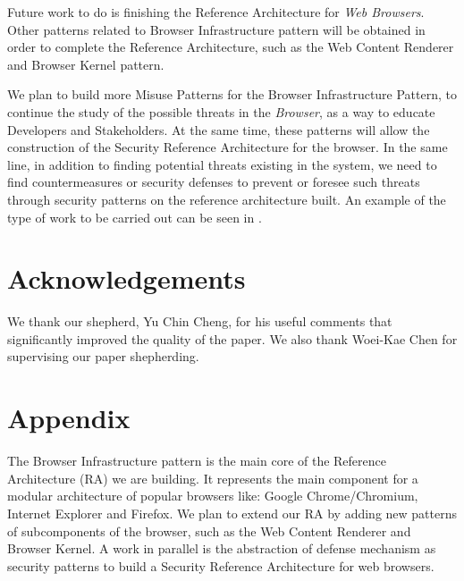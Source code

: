 \documentclass{sig-alternate-05-2015}
\begin{document}
Future work to do is finishing the Reference Architecture for \textit{Web Browsers}. Other patterns related to Browser Infrastructure pattern will be obtained in order to complete the Reference Architecture, such as the Web Content Renderer and Browser Kernel pattern. 

We plan to build more Misuse Patterns for the Browser Infrastructure Pattern, to continue the study of the possible threats in the \textit{Browser}, as a way to educate Developers and Stakeholders. At the same time, these patterns will allow the construction of the Security Reference Architecture for the browser. In the same line, in addition to finding potential threats existing in the system, we need to find countermeasures or security defenses to prevent or foresee such threats through security patterns on the reference architecture built. An example of the type of work to be carried out can be seen in \cite{Fernandez2015}.

\section{Acknowledgements}
We thank our shepherd, Yu Chin Cheng, for his useful comments that significantly improved the quality of the paper. We also thank Woei-Kae Chen for supervising our paper shepherding.


\section{Appendix}
The Browser Infrastructure pattern is the main core of the Reference Architecture (RA) we are building. It represents the main component for a modular architecture of popular browsers like: Google Chrome/Chromium, Internet Explorer and Firefox. We plan to extend our RA by adding new patterns of subcomponents of the browser, such as the Web Content Renderer and Browser Kernel. A work in parallel is the abstraction of defense mechanism as security patterns to build a Security Reference Architecture for web browsers.


  

\end{document}
